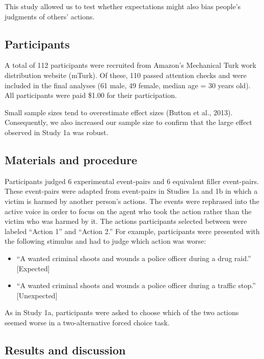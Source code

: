 \documentclass[10pt, letterpaper]{article}
\begin{document}
This study allowed us to test whether expectations might also bias
people's judgments of others' actions.

\subsection{Participants}\label{participants-1}

A total of 112 participants were recruited from Amazon's Mechanical Turk
work distribution website (mTurk). Of these, 110 passed attention checks
and were included in the final analyses (61 male, 49 female, median age
= 30 years old). All participants were paid \$1.00 for their
participation.

Small sample sizes tend to overestimate effect sizes (Button et al.,
2013). Consequently, we also increased our sample size to confirm that
the large effect observed in Study 1a was robust.

\subsection{Materials and procedure}\label{materials-and-procedure-1}

Participants judged 6 experimental event-pairs and 6 equivalent filler
event-pairs. These event-pairs were adapted from event-pairs in Studies
1a and 1b in which a victim is harmed by another person's actions. The
events were rephrased into the active voice in order to focus on the
agent who took the action rather than the victim who was harmed by it.
The actions participants selected between were labeled ``Action 1'' and
``Action 2.'' For example, participants were presented with the
following stimulus and had to judge which action was worse:

\begin{itemize}
\item
  ``A wanted criminal shoots and wounds a police officer during a drug
  raid.'' {[}Expected{]}
\item
  ``A wanted criminal shoots and wounds a police officer during a
  traffic stop.'' {[}Unexpected{]}
\end{itemize}

As in Study 1a, participants were asked to choose which of the two
actions seemed worse in a two-alternative forced choice task.

\subsection{Results and discussion}\label{results-and-discussion-1}
\end{document}
